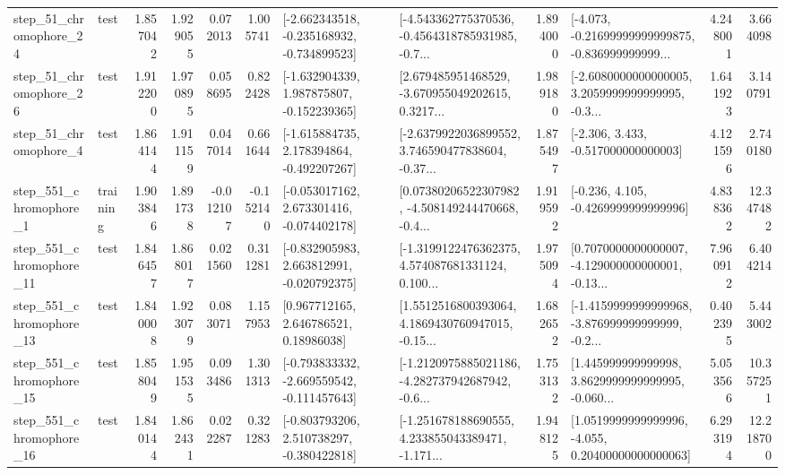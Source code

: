 \begin{tabular}{llrrrrllrlrr}
   step\_51\_chromophore\_24 &      test &      1.857042 &    1.929055 &      0.072013 &  1.005741 &  [-2.662343518, -0.235168932, -0.734899523] &  [-4.543362775370536, -0.4564318785931985, -0.7... &       1.894000 &  [-4.073, -0.21699999999999875, -0.836999999999... &            4.248001 &          3.664098 \\
   step\_51\_chromophore\_26 &      test &      1.912200 &    1.970895 &      0.058695 &  0.822428 &   [-1.632904339, 1.987875807, -0.152239365] &  [2.679485951468529, -3.670955049202615, 0.3217... &       1.989180 &  [-2.6080000000000005, 3.2059999999999995, -0.3... &            1.641923 &          3.140791 \\
    step\_51\_chromophore\_4 &      test &      1.864144 &    1.911159 &      0.047014 &  0.661644 &   [-1.615884735, 2.178394864, -0.492207267] &  [-2.6379922036899552, 3.746590477838604, -0.37... &       1.875497 &                [-2.306, 3.433, -0.517000000000003] &            4.121596 &          2.740180 \\
   step\_551\_chromophore\_1 &  training &      1.903846 &    1.891738 &     -0.012107 & -0.152140 &   [-0.053017162, 2.673301416, -0.074402178] &  [0.07380206522307982, -4.508149244470668, -0.4... &       1.919592 &               [-0.236, 4.105, -0.4269999999999996] &            4.838362 &         12.347482 \\
  step\_551\_chromophore\_11 &      test &      1.846457 &    1.868017 &      0.021560 &  0.311281 &   [-0.832905983, 2.663812991, -0.020792375] &  [-1.3199122476362375, 4.574087681331124, 0.100... &       1.975094 &  [0.7070000000000007, -4.129000000000001, -0.13... &            7.960912 &          6.404214 \\
  step\_551\_chromophore\_13 &      test &      1.840008 &    1.923079 &      0.083071 &  1.157953 &      [0.967712165, 2.646786521, 0.18986038] &  [1.5512516800393064, 4.1869430760947015, -0.15... &       1.682652 &  [-1.4159999999999968, -3.876999999999999, -0.2... &            0.402395 &          5.443002 \\
  step\_551\_chromophore\_15 &      test &      1.858049 &    1.951535 &      0.093486 &  1.301313 &  [-0.793833332, -2.669559542, -0.111457643] &  [-1.2120975885021186, -4.282737942687942, -0.6... &       1.753132 &  [1.445999999999998, 3.8629999999999995, -0.060... &            5.053566 &         10.357251 \\
  step\_551\_chromophore\_16 &      test &      1.840144 &    1.862431 &      0.022287 &  0.321283 &   [-0.803793206, 2.510738297, -0.380422818] &  [-1.251678188690555, 4.233855043389471, -1.171... &       1.948125 &  [1.0519999999999996, -4.055, 0.20400000000000063] &            6.293194 &         12.218700 \\

\end{tabular}
